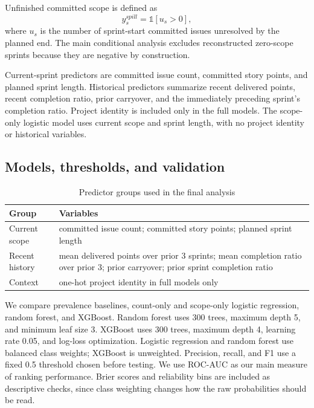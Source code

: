 \documentclass[conference]{IEEEtran}
\begin{document}
Unfinished committed scope is defined as
\begin{equation}
y^{spill}_s = \mathbb{1}[u_s>0],
\end{equation}
where $u_s$ is the number of sprint-start committed issues unresolved by the planned end. The main conditional analysis excludes reconstructed zero-scope sprints because they are negative by construction.

Current-sprint predictors are committed issue count, committed story points, and planned sprint length. Historical predictors summarize recent delivered points, recent completion ratio, prior carryover, and the immediately preceding sprint's completion ratio. Project identity is included only in the full models. The scope-only logistic model uses current scope and sprint length, with no project identity or historical variables.

\subsection{Models, thresholds, and validation}
\begin{table}[!htb]
\centering\scriptsize
\caption{Predictor groups used in the final analysis}
\label{tab:features}
\setlength{\tabcolsep}{2.3pt}
\begin{tabular}{@{}p{2.2cm}p{4.55cm}@{}}
\toprule
Group & Variables\\
\midrule
Current scope & committed issue count; committed story points; planned sprint length\\
Recent history & mean delivered points over prior 3 sprints; mean completion ratio over prior 3; prior carryover; prior sprint completion ratio\\
Context & one-hot project identity in full models only\\
\bottomrule
\end{tabular}
\end{table}

We compare prevalence baselines, count-only and scope-only logistic regression, random forest, and XGBoost. Random forest uses 300 trees, maximum depth 5, and minimum leaf size 3. XGBoost uses 300 trees, maximum depth 4, learning rate 0.05, and log-loss optimization. Logistic regression and random forest use balanced class weights; XGBoost is unweighted. Precision, recall, and F1 use a fixed 0.5 threshold chosen before testing. We use ROC-AUC as our main measure of ranking performance. Brier scores and reliability bins are included as descriptive checks, since class weighting changes how the raw probabilities should be read.
\end{document}

